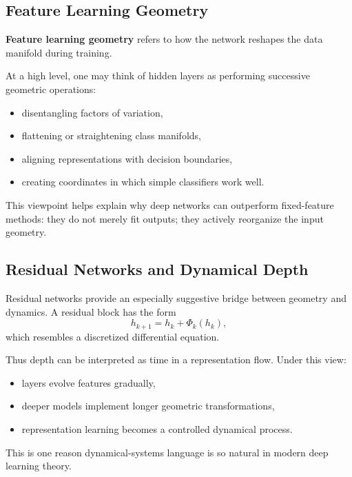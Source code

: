 \subsection{Feature Learning Geometry}

\textbf{Feature learning geometry} refers to how the network reshapes the data manifold during training.

\medskip

\noindent
At a high level, one may think of hidden layers as performing successive geometric operations:
\begin{itemize}
    \item disentangling factors of variation,
    \item flattening or straightening class manifolds,
    \item aligning representations with decision boundaries,
    \item creating coordinates in which simple classifiers work well.
\end{itemize}

\medskip

\noindent
This viewpoint helps explain why deep networks can outperform fixed-feature methods: they do not merely fit outputs; they actively reorganize the input geometry.

\subsection{Residual Networks and Dynamical Depth}

Residual networks provide an especially suggestive bridge between geometry and dynamics. A residual block has the form
\[
h_{k+1}=h_k + \Phi_k(h_k),
\]
which resembles a discretized differential equation.

\medskip

\noindent
Thus depth can be interpreted as time in a representation flow. Under this view:
\begin{itemize}
    \item layers evolve features gradually,
    \item deeper models implement longer geometric transformations,
    \item representation learning becomes a controlled dynamical process.
\end{itemize}

\medskip

\noindent
This is one reason dynamical-systems language is so natural in modern deep learning theory.

